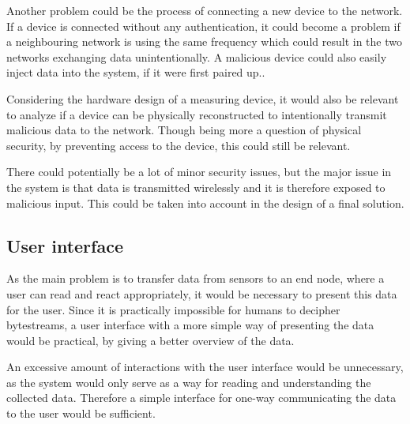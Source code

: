 Another problem could be the process of connecting a new device to the network. If a device is connected without any authentication, it could become a problem if a neighbouring network is using the same frequency which could result in the two networks exchanging data unintentionally. A malicious device could also easily inject data into the system, if it were first paired up..

Considering the hardware design of a measuring device, it would also be relevant to analyze if a device can be physically reconstructed to intentionally transmit malicious data to the network. Though being more a question of physical security, by preventing access to the device, this could still be relevant.

There could potentially be a lot of minor security issues, but the major issue in the system is that data is transmitted wirelessly and it is therefore exposed to malicious input. This could be taken into account in the design of a final solution.

\subsection{User interface}
As the main problem is to transfer data from sensors to an end node, where a user can read and react appropriately, it would be necessary to present this data for the user. Since it is practically impossible for humans to decipher bytestreams, a user interface with a more simple way of presenting the data would be practical, by giving a better overview of the data.

An excessive amount of interactions with the user interface would be unnecessary, as the system would only serve as a way for reading and understanding the collected data. Therefore a simple interface for one-way communicating the data to the user would be sufficient.
